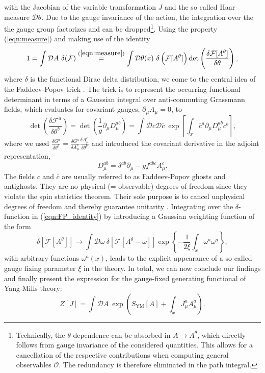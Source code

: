 with the Jacobian of the variable transformation $J$ and the so called Haar measure $\mathcal{D}\theta$. Due to the gauge invariance of the action, the integration over the the gauge group factorizes and can be dropped\footnote{Technically, the $\theta$-dependence can be absorbed in $A\rightarrow A^{\theta}$, which directly follows from gauge invariance of the considered quantities. This allows for a cancellation of the respective contributions when computing general observables $\mathcal{O}$. The redundancy is therefore eliminated in the path integral.}. Using the property (\ref{eqn:measure}) and making use of the identity
\begin{equation}
1=\int \mathcal{D} A\ \delta( \mathcal{F})\overset{(\ref{eqn:measure})}{=}\int \mathcal{D} \theta(x)\ \delta\left( \mathcal{F}[A^{\theta}]\right) \operatorname{det}\left(\frac{\delta  \mathcal{F}[A^{\theta}]}{\delta \theta}\right),
\label{eqn:FP_identity}
\end{equation}
where $\delta$ is the functional Dirac delta distribution, we come to the central idea of the Faddeev-Popov trick \cite{FaddeevPopov1967}. The trick is to represent the occurring functional determinant in terms of a Gaussian integral over anti-commuting Grassmann fields, which evaluates for covariant gauges, $\partial_{\mu}A_{\mu}=0$, to 
\begin{equation}
\operatorname{det}\left(\frac{\delta \mathcal{F}^{a}}{\delta \theta^{b}}\right)=\operatorname{det}\left(\frac{1}{g} \partial_{\mu} D_{\mu}^{a b}\right)=\int \mathcal{D} c \mathcal{D} \bar{c}\ \exp \left[\int_{x} \bar{c}^{a} \partial_{\mu} D_{\mu}^{a b} c^{b}\right],
\end{equation}
where we used $\frac{\delta G^{a}}{\delta \theta^{b}}=\frac{\delta G^{a}}{\delta A_{\mu}^{c}} \frac{\delta A_{\mu}^{c}}{\delta \theta^{b}}$ and introduced the covariant derivative in the adjoint representation,
\begin{equation}
D_{\mu}^{a b}=\delta^{a b} \partial_{\mu}-g f^{a b c} A_{\mu}^{c}.
\end{equation}
The fields $c$ and $\bar{c}$ are usually referred to as Faddeev-Popov ghosts and antighosts. They are no physical (= observable) degrees of freedom since they violate the spin statistics theorem. Their sole purpose is to cancel unphysical degrees of freedom and thereby guarantee unitarity \cite{Cyrol2017}. Integrating over the $\delta$-function in (\ref{eqn:FP_identity}) by introducing a Gaussian weighting function of the form 
\begin{equation}
\delta\left[\mathcal{F}[A^{\theta}]\right] \rightarrow \int \mathcal{D}\omega\ \delta\left[\mathcal{F}[A^{\theta}-\omega]\right] \exp \left\{-\frac{1}{2 \xi} \int_{x} \omega^{a} \omega^{a}\right\},
\end{equation}
with arbitrary functions $\omega^{a}(x)$, leads to the explicit appearance of a so called gauge fixing parameter $\xi$ in the theory.
In total, we can now conclude our findings and finally present the expression for the gauge-fixed generating functional of Yang-Mills theory:
\begin{equation}
Z[J]=\int \mathcal{D}A\ \exp \left(S_{\mathrm{YM}}[A]+\int_{x} J_{\mu}^{a} A_{\mu}^{a}\right).
\end{equation}

